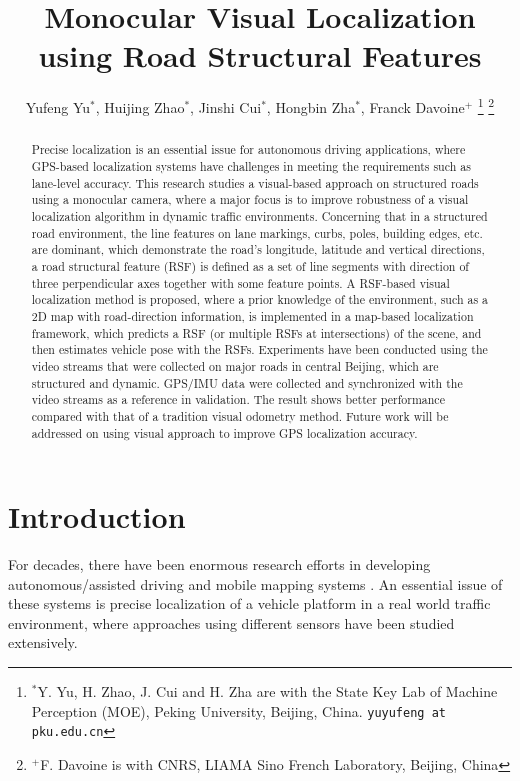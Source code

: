 \documentclass[letterpaper, 10 pt, conference]{ieeeconf}  %
\title{\LARGE \bf
Monocular Visual Localization using Road Structural Features
}
\author{Yufeng Yu$^{*}$, Huijing Zhao$^{*}$, Jinshi Cui$^{*}$, Hongbin Zha$^{*}$, Franck Davoine$^{+}$
\thanks{$^{*}$Y. Yu, H. Zhao, J. Cui and H. Zha are with the State Key Lab of Machine Perception (MOE), Peking University, Beijing, China. {\tt\small yuyufeng at pku.edu.cn}}
\thanks{$^{+}$F. Davoine is with CNRS, LIAMA Sino French Laboratory, Beijing, China}%
}
\begin{document}
\maketitle
\thispagestyle{empty}
\pagestyle{empty}


\begin{abstract}

Precise localization is an essential issue for autonomous driving applications, where GPS-based localization systems have challenges in meeting the requirements such as lane-level accuracy. This research studies a visual-based approach on structured roads using a monocular camera, where a major focus is to improve robustness of a visual localization algorithm in dynamic traffic environments. Concerning that in a structured road environment, the line features on lane markings, curbs, poles, building edges, etc. are dominant, which demonstrate the road's longitude, latitude and vertical directions, a road structural feature (RSF) is defined as a set of line segments with direction of three perpendicular axes together with some feature points. A RSF-based visual localization method is proposed, where a prior knowledge of the environment, such as a 2D map with road-direction information, is implemented in a map-based localization framework, which predicts a RSF (or multiple RSFs at intersections) of the scene, and then estimates vehicle pose with the RSFs. Experiments have been conducted using the video streams that were collected on major roads in central Beijing, which are structured and dynamic. GPS/IMU data were collected and synchronized with the video streams as a reference in validation. The result shows better performance compared with that of a tradition visual odometry method. Future work will be addressed on using visual approach to improve GPS localization accuracy.
\end{abstract}

\section{Introduction}
For decades, there have been enormous research efforts in developing autonomous/assisted driving and mobile mapping systems \cite{urmson2008autonomous}. An essential issue of these systems is precise localization of a vehicle platform in a real world traffic environment, where approaches using different sensors have been studied extensively.
\end{document}
